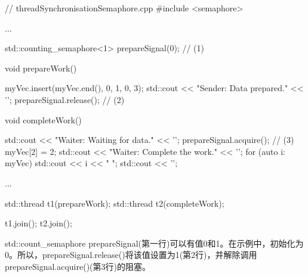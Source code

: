 \begin{cpp}
// threadSynchronisationSemaphore.cpp
#include <semaphore>

...

std::counting_semaphore<1> prepareSignal(0); // (1)

void prepareWork() {
	
	myVec.insert(myVec.end(), {0, 1, 0, 3});
	std::cout << "Sender: Data prepared." << '\n';
	prepareSignal.release(); // (2)
}

void completeWork() {
	
	std::cout << "Waiter: Waiting for data." << '\n';
	prepareSignal.acquire(); // (3)
	myVec[2] = 2;
	std::cout << "Waiter: Complete the work." << '\n';
	for (auto i: myVec) std::cout << i << " ";
	std::cout << '\n';
}

...

std::thread t1(prepareWork);
std::thread t2(completeWork);

t1.join();
t2.join();
\end{cpp}

std::count\_semaphore prepareSignal(第一行)可以有值0和1。在示例中，初始化为0。所以，prepareSignal.release()将该值设置为1(第2行)，并解除调用prepareSignal.acquire()(第3行)的阻塞。


































